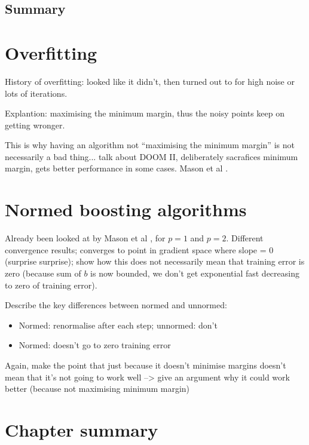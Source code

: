 \subsection{Summary}

\section{Overfitting}

History of overfitting: looked like it didn't, then turned out to
for high noise or lots of iterations.

Explantion: maximising the minimum margin, thus the noisy points keep
on getting wronger.

This is why having an algorithm not ``maximising the minimum margin''
is not necessarily a bad thing... talk about DOOM II, deliberately
sacrafices minimum margin, gets better performance in some cases.
Mason et al \cite{Mason99}.

\section{Normed boosting algorithms}

Already been looked at by Mason et al \cite{Mason99a}, for $p=1$ and
$p=2$.  Different convergence results; converges to point in gradient
space where slope = 0 (surprise surprise); show how this does not
necessarily mean that training error is zero (because sum of
$b$ is now bounded, we don't get exponential fast decreasing to zero
of training error).

Describe the key differences between normed and unnormed:
\begin{itemize}
\item	Normed: renormalise after each step; unnormed: don't
\item	Normed: doesn't go to zero training error
\end{itemize}

Again, make the point that just because it doesn't minimise margins
doesn't mean that it's not going to work well --> give an argument why
it could work better (because not maximising minimum margin)


\section{Chapter summary}



